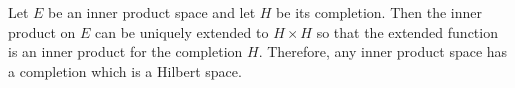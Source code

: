 Let $E$ be an inner product space and let $H$ be its completion. Then the inner product on $E$ can be uniquely extended to $H \times H$ so that the extended function is an inner product for the completion $H$. Therefore, any inner product space has a completion which is a Hilbert space.
